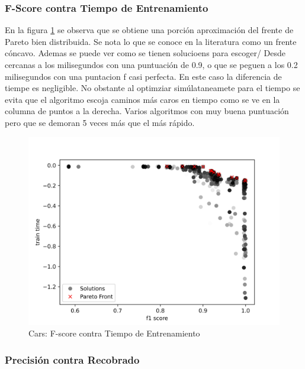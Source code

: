 \subsubsection{F-Score contra Tiempo de Entrenamiento}

En la figura \ref{impl:fig:cars:fscore_vs_time} se observa que se obtiene una porci\'on aproximaci\'on del frente de Pareto bien distribuida. Se nota lo que se conoce en la literatura como un frente c\'oncavo. Ademas se puede ver como se tienen solucioens para escoger/ Desde cercanas a los milisegundos con una puntuaci\'on de 0.9, o que se peguen a los 0.2 milisegundos con una puntacion f casi perfecta. En este caso la diferencia de tiempe es negligible. No obstante al optimziar sim\'ulataneamete para el tiempo se evita que el algoritmo escoja caminos m\'as caros en tiempo como se ve en la columna de puntos a la derecha. Varios algoritmos con muy buena puntuaci\'on pero que se demoran 5 veces m\'as que el m\'as r\'apido.


\begin{figure}[H]
    \centering
    \includegraphics[scale=0.75]{Pictures/cars_fscore_vs_time.jpg}
    \caption{Cars: F-score contra Tiempo de Entrenamiento}
    \label{impl:fig:cars:fscore_vs_time}
\end{figure}


\subsubsection{Precisi\'on contra Recobrado}

